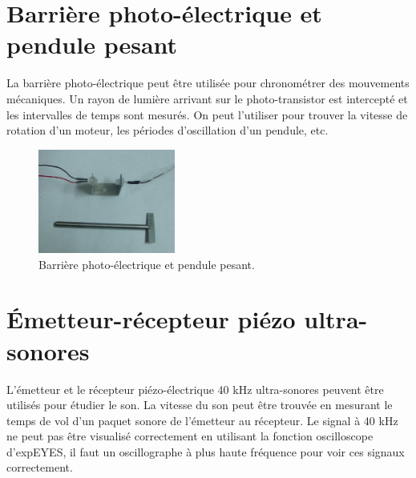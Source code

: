 \documentclass{book}
\begin{document}
\section{Barrière photo-électrique et pendule pesant}





La barrière photo-électrique peut être utilisée pour chronométrer des mouvements mécaniques. Un rayon de lumière arrivant sur le photo-transistor est intercepté et les intervalles de temps sont mesurés. On peut l'utiliser pour trouver la vitesse de rotation d'un moteur, les périodes d'oscillation d'un pendule, etc.



\begin{figure}[h!]
\begin{center}
\caption{\label{fig:Light-Barrier-and1}Barrière photo-électrique et pendule pesant. }\vspace{0.5em}
\includegraphics[width=0.4\textwidth, height=0.3\textwidth, keepaspectratio]{Pic-light-bar-rodpend-photo.png}
\end{center}
\end{figure}







\section{Émetteur-récepteur piézo ultra-sonores}





L'émetteur et le récepteur piézo-électrique 40 kHz ultra-sonores peuvent être utilisés pour étudier le son. La vitesse du son peut être trouvée en mesurant le temps de vol d'un paquet sonore de l'émetteur au récepteur. Le signal à 40 kHz ne peut pas être visualisé correctement en utilisant la fonction oscilloscope d'expEYES, il faut un oscillographe à plus haute fréquence pour voir ces signaux correctement.
\end{document}

